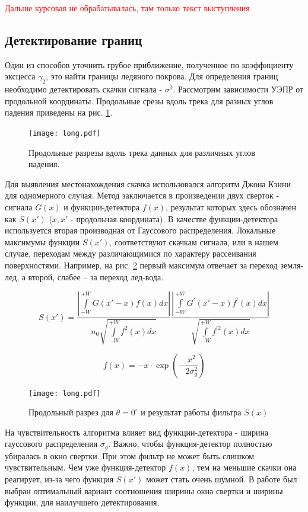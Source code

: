 \textcolor{red}{Дальше курсовая не обрабатывалась, там только текст выступления}
\subsection{Детектирование границ}
Один из способов уточнить грубое приближение, полученное по коэффициенту эксцесса $\gamma_2$, это найти границы ледяного покрова.
Для определения границ необходимо детектировать скачки сигнала - $\sigma^0$. Рассмотрим зависимости УЭПР от продольной
координаты. Продольные срезы вдоль трека для разных углов падения приведены на рис. \ref{fig:8}.

\begin{figure}[h!]
  \centering
  \texttt{[image: long.pdf]}
  \caption{Продольные разрезы вдоль трека данных для различных углов падения.}
  \label{fig:8}
\end{figure}


Для выявления местонахождения скачка использовался алгоритм Джона Кэнни \cite{canny} для одномерного случая. Метод
заключается в произведении двух сверток - сигнала $G(x)$ и функции-детектора $f(x)$, результат которых здесь обозначен
как $S(x')$ ($x,x'$  - продольная координата). В качестве функции-детектора используется вторая производная
от Гауссового распределения.  Локальные максимумы функции $S(x')$,
соответствуют скачкам сигнала, или в нашем случае, переходам
между различающимися по характеру рассеивания поверхностями. Например, на рис. \ref{fig:9} первый максимум отвечает за переход
земля-лед, а второй, слабее – за переход лед-вода. 

\begin{equation}
  S(x') = \frac{\left|\int \limits_{-W}^{+W} G(x'-x) f(x) d x\right|}{n_{0} \sqrt{\int \limits_{-W}^{+W} f^{2}(x) d x}} \frac{\left|\int \limits_{-W}^{+W} G^{\prime}(x'-x) f^{\prime}(x) d x\right|}{\sqrt{\int \limits_{-W}^{+W} f^{\prime 2}(x) d x}}
  \label{eq:S}
\end{equation}

\begin{equation}
  f(x) = -x\cdot \exp(-\frac{x^2}{2\sigma^2_g})
  \label{eq:fx}
\end{equation}


\begin{figure}[h!]
  \centering
  \texttt{[image: long.pdf]}
  \caption{Продольный разрез для $\theta = 0^{\circ}$ и результат работы фильтра $S(x)$}
  \label{fig:9}
\end{figure}

На чувствительность алгоритма влияет вид функции-детектора - ширина гауссового распределения $\sigma_g$. Важно, чтобы
функция-детектор полностью убиралась в окно свертки. При этом фильтр не может быть слишком чувствительным. Чем уже
функция-детектор $f(x)$, тем на меньшие скачки она реагирует, из-за чего функция $S(x')$ может стать очень шумной. В
работе был выбран оптимальный вариант соотношения ширины окна свертки и ширины функции, для наилучшего
детектирования. 

